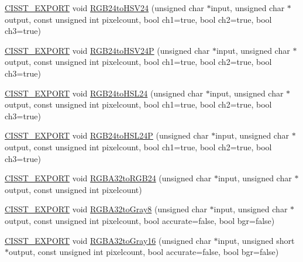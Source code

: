 \begin{DoxyCompactItemize}
\item 
\hyperlink{cmn_export_macros_8h_a99393e0c3ac434b2605235bbe20684f8}{C\-I\-S\-S\-T\-\_\-\-E\-X\-P\-O\-R\-T} void \hyperlink{namespacesvl_converter_a8438f6d1c5c4f952bcb74ca713cc3e92}{R\-G\-B24to\-H\-S\-V24} (unsigned char $\ast$input, unsigned char $\ast$output, const unsigned int pixelcount, bool ch1=true, bool ch2=true, bool ch3=true)
\item 
\hyperlink{cmn_export_macros_8h_a99393e0c3ac434b2605235bbe20684f8}{C\-I\-S\-S\-T\-\_\-\-E\-X\-P\-O\-R\-T} void \hyperlink{namespacesvl_converter_ac698913e63b8eb4e52ee68c04136d371}{R\-G\-B24to\-H\-S\-V24\-P} (unsigned char $\ast$input, unsigned char $\ast$output, const unsigned int pixelcount, bool ch1=true, bool ch2=true, bool ch3=true)
\item 
\hyperlink{cmn_export_macros_8h_a99393e0c3ac434b2605235bbe20684f8}{C\-I\-S\-S\-T\-\_\-\-E\-X\-P\-O\-R\-T} void \hyperlink{namespacesvl_converter_ad4b71b99c952b6cf243780117d0b0b7b}{R\-G\-B24to\-H\-S\-L24} (unsigned char $\ast$input, unsigned char $\ast$output, const unsigned int pixelcount, bool ch1=true, bool ch2=true, bool ch3=true)
\item 
\hyperlink{cmn_export_macros_8h_a99393e0c3ac434b2605235bbe20684f8}{C\-I\-S\-S\-T\-\_\-\-E\-X\-P\-O\-R\-T} void \hyperlink{namespacesvl_converter_a9636254f31fb58640d0dbb23f68851c6}{R\-G\-B24to\-H\-S\-L24\-P} (unsigned char $\ast$input, unsigned char $\ast$output, const unsigned int pixelcount, bool ch1=true, bool ch2=true, bool ch3=true)
\item 
\hyperlink{cmn_export_macros_8h_a99393e0c3ac434b2605235bbe20684f8}{C\-I\-S\-S\-T\-\_\-\-E\-X\-P\-O\-R\-T} void \hyperlink{namespacesvl_converter_a7b53edede43334f9f9af1a332b5546ca}{R\-G\-B\-A32to\-R\-G\-B24} (unsigned char $\ast$input, unsigned char $\ast$output, const unsigned int pixelcount)
\item 
\hyperlink{cmn_export_macros_8h_a99393e0c3ac434b2605235bbe20684f8}{C\-I\-S\-S\-T\-\_\-\-E\-X\-P\-O\-R\-T} void \hyperlink{namespacesvl_converter_a65628ee6d10da68b6ad3133e3fb19ee6}{R\-G\-B\-A32to\-Gray8} (unsigned char $\ast$input, unsigned char $\ast$output, const unsigned int pixelcount, bool accurate=false, bool bgr=false)
\item 
\hyperlink{cmn_export_macros_8h_a99393e0c3ac434b2605235bbe20684f8}{C\-I\-S\-S\-T\-\_\-\-E\-X\-P\-O\-R\-T} void \hyperlink{namespacesvl_converter_a8dd1e673db19a4027e3f7112ffc59928}{R\-G\-B\-A32to\-Gray16} (unsigned char $\ast$input, unsigned short $\ast$output, const unsigned int pixelcount, bool accurate=false, bool bgr=false)

\end{DoxyCompactItemize}
